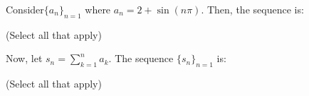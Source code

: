 \documentclass{ximera}
\author{Jim Talamo}
\begin{document}
\begin{exercise}
Consider$\{a_n \}_{n=1}$ where $a_n = 2+ \sin(n\pi)$.  Then, the sequence is:

\begin{selectAll}
\end{selectAll}
(Select all that apply)

Now, let $s_n = \sum_{k=1}^{n} a_k$.  The sequence $\{s_n \}_{n=1}$ is:
\begin{selectAll}
\end{selectAll}
(Select all that apply)

\end{exercise}
\end{document}
